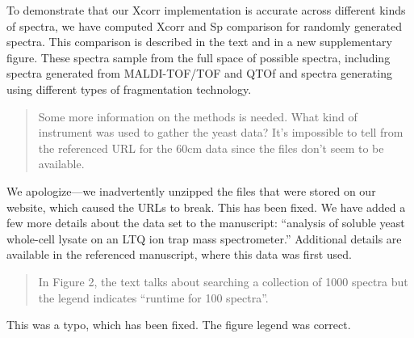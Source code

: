 \documentclass{article}
\newcommand{\breview}{\begin{quotation}\begin{em}\noindent}
\newcommand{\ereview}{\end{em}\end{quotation}}
\begin{document}
To demonstrate that our Xcorr implementation is accurate across
different kinds of spectra, we have computed Xcorr and Sp comparison
for randomly generated spectra.  This comparison is described in the
text and in a new supplementary figure.  These spectra sample from the
full space of possible spectra, including spectra generated from
MALDI-TOF/TOF and QTOf and spectra generating using different types of
fragmentation technology.

\breview Some more information on the methods is needed. What kind of
instrument was used to gather the yeast data? It's impossible to tell
from the referenced URL for the 60cm data since the files don't seem
to be available. \ereview

We apologize---we inadvertently unzipped the files that were stored on
our website, which caused the URLs to break.  This has been fixed.  We
have added a few more details about the data set to the manuscript:
``analysis of soluble yeast whole-cell lysate on an LTQ ion trap mass
spectrometer.''  Additional details are available in the referenced
manuscript, where this data was first used.

\breview In Figure 2, the text talks about searching a collection of
1000 spectra but the legend indicates ``runtime for 100
spectra''. \ereview

This was a typo, which has been fixed.  The figure legend was correct.
\end{document}
